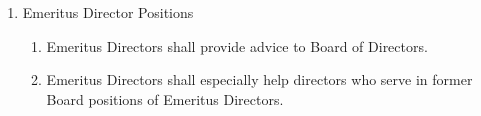 \begin{enumerate}
\begin{enumerate}
	\end{enumerate}
	\item Emeritus Director Positions
	\begin{enumerate}
		\item Emeritus Directors shall provide advice to Board of Directors.
		\item Emeritus Directors shall especially help directors who serve in former Board positions of Emeritus Directors.
	\end{enumerate}
\end{enumerate}

\newpage

